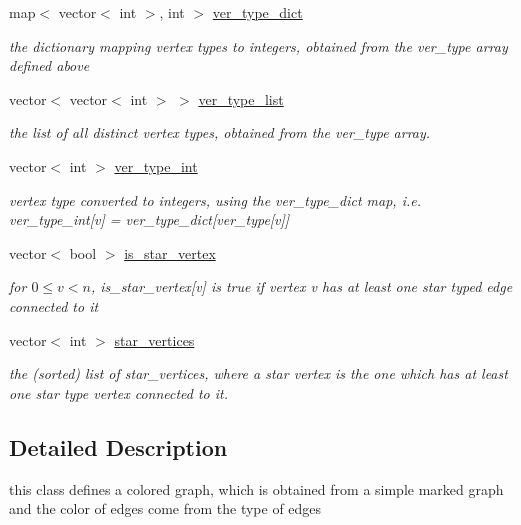 \begin{DoxyCompactItemize}
map$<$ vector$<$ int $>$, int $>$ \hyperlink{classcolored__graph_aeb780762429ddac375799f4a45405712}{ver\+\_\+type\+\_\+dict}
\begin{DoxyCompactList}\small\item\em the dictionary mapping vertex types to integers, obtained from the ver\+\_\+type array defined above \end{DoxyCompactList}\item 
vector$<$ vector$<$ int $>$ $>$ \hyperlink{classcolored__graph_a3a1ae8abac458d20a2afb4aa48bbc956}{ver\+\_\+type\+\_\+list}
\begin{DoxyCompactList}\small\item\em the list of all distinct vertex types, obtained from the ver\+\_\+type array. \end{DoxyCompactList}\item 
vector$<$ int $>$ \hyperlink{classcolored__graph_a491ed2ea1a65118af02ec606c8d44c0a}{ver\+\_\+type\+\_\+int}
\begin{DoxyCompactList}\small\item\em vertex type converted to integers, using the ver\+\_\+type\+\_\+dict map, i.\+e. ver\+\_\+type\+\_\+int\mbox{[}v\mbox{]} = ver\+\_\+type\+\_\+dict\mbox{[}ver\+\_\+type\mbox{[}v\mbox{]}\mbox{]} \end{DoxyCompactList}\item 
vector$<$ bool $>$ \hyperlink{classcolored__graph_ad41163e970530c7e45878d299f0dc961}{is\+\_\+star\+\_\+vertex}
\begin{DoxyCompactList}\small\item\em for $0 \leq v < n$, is\+\_\+star\+\_\+vertex\mbox{[}v\mbox{]} is true if vertex v has at least one star typed edge connected to it \end{DoxyCompactList}\item 
vector$<$ int $>$ \hyperlink{classcolored__graph_ab7ee8d717abde7ad7467ef695038f574}{star\+\_\+vertices}
\begin{DoxyCompactList}\small\item\em the (sorted) list of star\+\_\+vertices, where a star vertex is the one which has at least one star type vertex connected to it. \end{DoxyCompactList}\end{DoxyCompactItemize}


\subsection{Detailed Description}
this class defines a colored graph, which is obtained from a simple marked graph and the color of edges come from the type of edges 

